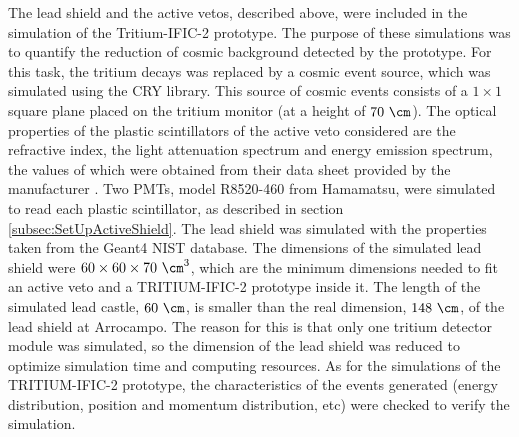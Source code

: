 The lead shield and the active vetos, described above, were included in the simulation of the Tritium-IFIC-2 prototype. The purpose of these simulations was to quantify the reduction of cosmic background detected by the prototype. For this task, the tritium decays was replaced by a cosmic event source, which was simulated using the CRY library. This source of cosmic events consists of a $1 \times 1$ square plane placed on the tritium monitor (at a height of $70~\cm$). The optical properties of the plastic scintillators of the active veto considered are the refractive index, the light attenuation spectrum and energy emission spectrum, the values of which were obtained from their data sheet provided by the manufacturer \cite{ScintillatorVeto}. Two PMTs, model R8520-460 from Hamamatsu, were simulated to read each plastic scintillator, as described in section \ref{subsec:SetUpActiveShield}. The lead shield was simulated with the properties taken from the Geant4 NIST database. The dimensions of the simulated lead shield were $60 \times 60 \times 70~\cm^3$, which are the minimum dimensions needed to fit an active veto and a TRITIUM-IFIC-2 prototype inside it. The length of the simulated lead castle, $60~\cm$, is smaller than the real dimension, $148~\cm$, of the lead shield at Arrocampo. The reason for this is that only one tritium detector module was simulated, so the dimension of the lead shield was reduced to optimize simulation time and computing resources. As for the simulations of the TRITIUM-IFIC-2 prototype, the characteristics of the events generated (energy distribution, position and momentum distribution, etc) were checked to verify the simulation.


